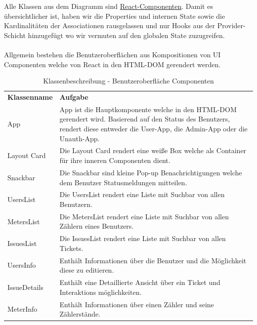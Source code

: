 Alle Klassen aus dem Diagramm sind \href{https://reactjs.org/docs/components-and-props.html}{React-Componenten}. Damit es übersichtlicher ist, haben wir die Properties und internen State sowie die Kardinalitäten der Associationen rausgelassen und nur Hooks aus der Provider-Schicht hinzugefügt wo wir vermuten auf den globalen State zuzugreifen. \\ \\
Allgemein bestehen die Benutzeroberflächen aus Kompositionen von UI Componenten welche von React in den HTML-DOM gerendert werden. 
 
\begin{table}[h]
	\centering
	\begin{tabularx}{\textwidth}{X X}
		\rowcolor[HTML]{C0C0C0} 
		\textbf{Klassenname} & \textbf{Aufgabe} \\
		App & App ist die Hauptkomponente welche in den HTML-DOM gerendert wird. Basierend auf den Status des Benutzers, rendert diese entweder die User-App, die Admin-App oder die Unauth-App. \\
		\rowcolor[HTML]{E7E7E7} 
		Layout Card & Die Layout Card rendert eine weiße Box welche als Container für ihre inneren Componenten dient.  \\
		Snackbar & Die Snackbar sind kleine Pop-up Benachrichtigungen welche dem Benutzer Statusmeldungen mitteilen.  \\
		\rowcolor[HTML]{E7E7E7} 
		UsersList & Die UsersList rendert eine Liste mit Suchbar von allen Benutzern. \\
		MetersList & Die MetersList rendert eine Liste mit Suchbar von allen Zählern eines Benutzers. \\
		\rowcolor[HTML]{E7E7E7} 
		IssuesList & Die IssuesList rendert eine Liste mit Suchbar von allen Tickets.\\
		UsersInfo & Enthält Informationen über die Benutzer und die Möglichkeit diese zu editieren. \\
		\rowcolor[HTML]{E7E7E7} 
		IssueDetails & Enthält eine Detaillierte Ansicht über ein Ticket und Interaktions möglichkeiten.\\
		MeterInfo & Enthält Informationen über einen Zähler und seine Zählerstände.
	\end{tabularx}
	\caption{Klassenbeschreibung - Benutzeroberfläche Componenten}
	\label{table:klassenbeschreibung-ui}
\end{table}
 
